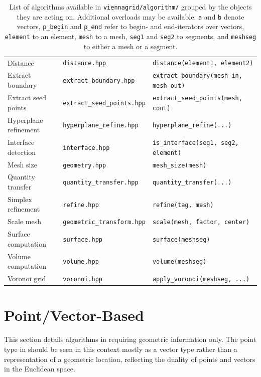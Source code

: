\begin{table}
\begin{tabular}{|l|l|l|}
   Distance              & \texttt{distance.hpp}              & \lstinline|distance(element1, element2)| \\
   Extract boundary      & \texttt{extract\_boundary.hpp}     & \lstinline|extract_boundary(mesh_in, mesh_out)| \\
   Extract seed points   & \texttt{extract\_seed\_points.hpp} & \lstinline|extract_seed_points(mesh, cont)| \\
   Hyperplane refinement & \texttt{hyperplane\_refine.hpp}    & \lstinline|hyperplane_refine(...)| \\
   Interface detection   & \texttt{interface.hpp}             & \lstinline|is_interface(seg1, seg2, element)|\\
   Mesh size             & \texttt{geometry.hpp}              & \lstinline|mesh_size(mesh)|\\
   Quantity transfer     & \texttt{quantity\_transfer.hpp}    & \lstinline|quantity_transfer(...)|\\
   Simplex refinement    & \texttt{refine.hpp}                & \lstinline|refine(tag, mesh)| \\
   Scale mesh            & \texttt{geometric\_transform.hpp}  & \lstinline|scale(mesh, factor, center)| \\
   Surface computation   & \texttt{surface.hpp}               & \lstinline|surface(meshseg)| \\
   Volume computation    & \texttt{volume.hpp}                & \lstinline|volume(meshseg)| \\
   Voronoi grid          & \texttt{voronoi.hpp}               & \lstinline|apply_voronoi(meshseg, ...)| \\
   \hline
 \end{tabular}
 \caption{List of algorithms available in \texttt{viennagrid/algorithm/} grouped by the objects they are acting on. Additional overloads may be available.
    \lstinline|a| and \lstinline|b| denote vectors, \lstinline|p_begin| and \lstinline|p_end| refer to begin- and end-iterators over vectors, \lstinline|element| to an element,
    \lstinline|mesh| to a mesh, \lstinline|seg1| and \lstinline|seg2| to segments, and \lstinline|meshseg| to either a mesh or a segment.}
 \label{tab:algorithms}
\end{table}


\section{Point/Vector-Based}
This section details algorithms in {\ViennaGrid} requiring geometric information only.
The point type in {\ViennaGrid} should be seen in this context mostly as a vector type rather than a representation of a geometric location, reflecting the duality of points and vectors in the Euclidean space.

